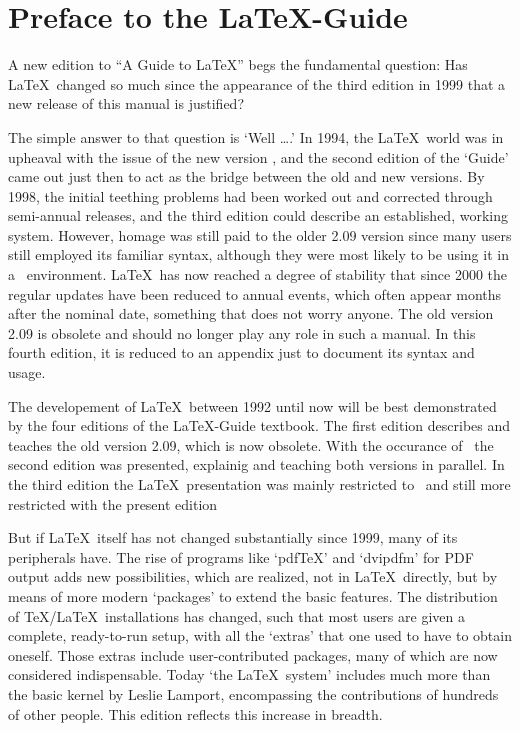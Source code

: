 \documentclass{article}
\begin{document}
\section*{Preface to the \LaTeX-Guide}

A new edition to ``A Guide to \LaTeX'' begs the fundamental question:
Has \LaTeX\ changed so much since the appearance of the third edition in 1999
that a new release of this manual is justified?

The simple answer to that question is `Well \dots.' In 1994, the \LaTeX\
world was in upheaval with the issue of the new version \LaTeXe, and the
second edition of the `Guide' came out just then to act as the bridge
between the old and new versions. By 1998, the initial teething problems had
been worked out and corrected through semi-annual releases, and the third
edition could describe an established, working system. However, homage was
still paid to the older 2.09 version since many users still employed its
familiar syntax, although they were most likely to be using it in a \LaTeXe\
environment. \LaTeX\ has now reached a degree of stability that since 2000
the regular updates have been reduced to annual events, which often appear
months after the nominal date, something that does not worry anyone. The old
version 2.09 is obsolete and should no longer play any role in such a manual.
In this fourth edition, it is reduced to an appendix just to document its
syntax and usage. 

The developement of \LaTeX\ between 1992 until now will be best demonstrated
by the four editions of the \LaTeX-Guide textbook. The first edition
\cite{dal92} describes and teaches the old version 2.09, which is now obsolete.
With the occurance of \LaTeXe\ the second edition \cite{dal95} was presented,
explainig and teaching both versions in parallel. In the third edition
\cite{dal99} the \LaTeX\ presentation was mainly restricted to \LaTeXe\
and still more restricted with the present edition \cite{dal03}
 
But if \LaTeX\ itself has not changed substantially since 1999, many of its
peripherals have. The rise of programs like `pdf\TeX'  and `dvipdfm' for
PDF output adds new possibilities, which are realized, not in \LaTeX\
directly, but by means of more modern `packages' to extend the basic
features. The distribution of \TeX/\LaTeX\ installations has changed, such
that most users are given a complete, ready-to-run setup, with all the
`extras' that one used to have to obtain oneself. Those extras include
user-contributed packages, many of which are now considered indispensable.
Today `the \LaTeX\ system' includes much more than the basic kernel by Leslie
Lamport, encompassing the contributions of hundreds of other people. This
edition reflects this increase in breadth.
\end{document}
